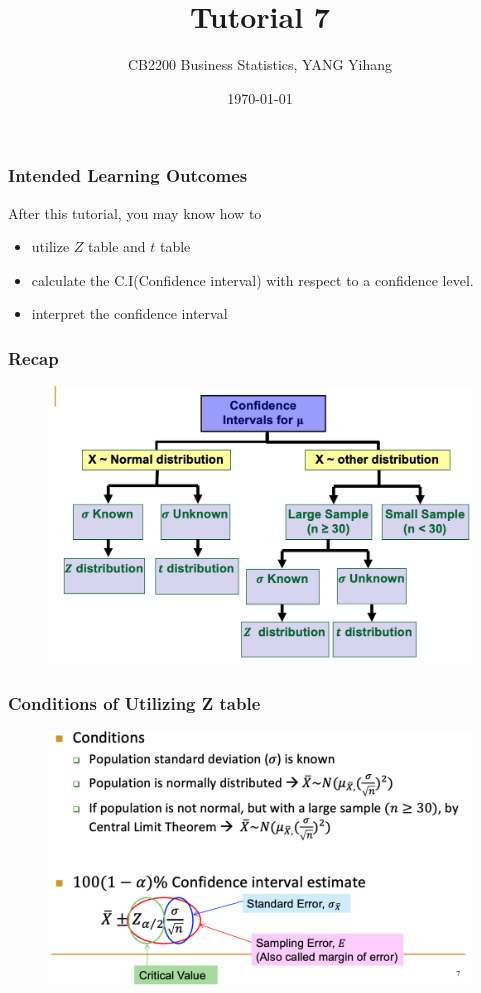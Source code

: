 \documentclass{beamer}
\title{Tutorial 7}
\author{CB2200 Business Statistics, YANG Yihang}
\date{\today}
\begin{document}
\titlepage
\begin{frame}
	\frametitle{Intended Learning Outcomes}
	After this tutorial, you may know how to 
	\begin{itemize}
		\item utilize $Z$ table and $t$ table
		\item calculate the C.I(Confidence interval) with respect to a confidence level.
		\item interpret the confidence interval
		\end{itemize}
	\end{frame}
\begin{frame}
	\frametitle{Recap}
	\begin{figure}
		\begin{center}
			\includegraphics[scale=0.40]{recap1.png}
		\end{center}
	\end{figure}
\end{frame}
\begin{frame}
\frametitle{Conditions of Utilizing Z table}
\begin{figure}
	\begin{center}
		\includegraphics[scale=0.40]{recap2.png}
	\end{center}
\end{figure}
\end{frame}
\end{document}
